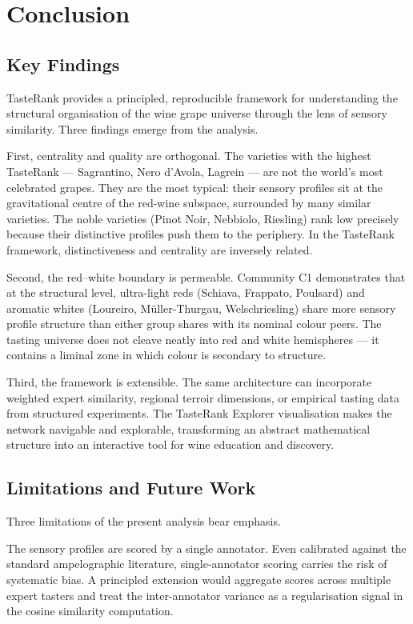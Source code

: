 \documentclass[11pt]{article}
\begin{document}
\section{Conclusion}

\subsection{Key Findings}
TasteRank provides a principled, reproducible framework for understanding the structural organisation of the wine grape universe through the lens of sensory similarity. Three findings emerge from the analysis.

First, centrality and quality are orthogonal. The varieties with the highest TasteRank --- Sagrantino, Nero d'Avola, Lagrein --- are not the world's most celebrated grapes. They are the most typical: their sensory profiles sit at the gravitational centre of the red-wine subspace, surrounded by many similar varieties. The noble varieties (Pinot Noir, Nebbiolo, Riesling) rank low precisely because their distinctive profiles push them to the periphery. In the TasteRank framework, distinctiveness and centrality are inversely related.

Second, the red--white boundary is permeable. Community C1 demonstrates that at the structural level, ultra-light reds (Schiava, Frappato, Poulsard) and aromatic whites (Loureiro, M\"uller-Thurgau, Welschriesling) share more sensory profile structure than either group shares with its nominal colour peers. The tasting universe does not cleave neatly into red and white hemispheres --- it contains a liminal zone in which colour is secondary to structure.

Third, the framework is extensible. The same architecture can incorporate weighted expert similarity, regional terroir dimensions, or empirical tasting data from structured experiments. The TasteRank Explorer visualisation makes the network navigable and explorable, transforming an abstract mathematical structure into an interactive tool for wine education and discovery.

\subsection{Limitations and Future Work}
Three limitations of the present analysis bear emphasis.

The sensory profiles are scored by a single annotator. Even calibrated against the standard ampelographic literature, single-annotator scoring carries the risk of systematic bias. A principled extension would aggregate scores across multiple expert tasters and treat the inter-annotator variance as a regularisation signal in the cosine similarity computation.
\end{document}
